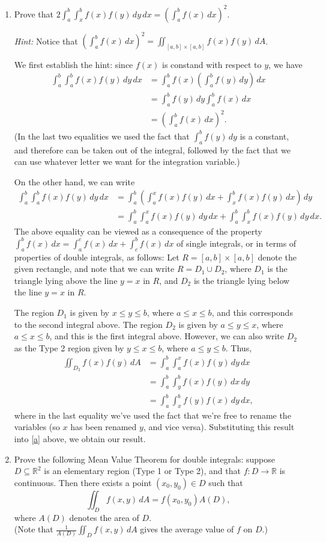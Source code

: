 \documentclass[letterpaper,12pt]{article}
\newcommand{\R}{\mathbb{R}}
\begin{document}
\begin{enumerate}
 \item Prove that $\displaystyle 2\int_a^b\int_x^b f(x)f(y)\,dy\,dx = \left(\int_a^b f(x)\,dx\right)^2$.

{\em Hint:} Notice that $\left(\int_a^b f(x)\,dx\right)^2 = \iint_{[a,b]\times [a,b]}f(x)f(y)\,dA$.

\bigskip

We first establish the hint: since $f(x)$ is constand with respect to $y$, we have
\begin{align*}
 \int_a^b\int_a^b f(x)f(y)\,dy\,dx &= \int_a^b f(x) \left(\int_a^b f(y)\,dy\right)\,dx\\
& = \int_a^b f(y)\,dy \int_a^bf(x)\,dx \\
& = \left(\int_a^b f(x)\,dx\right)^2.
\end{align*}
(In the last two equalities we used the fact that $\int_a^b f(y)\,dy$ is a constant, and therefore can be taken out of the integral, followed by the fact that we can use whatever letter we want for the integration variable.)

On the other hand, we can write
\begin{align}
 \int_a^b\int_a^b f(x)f(y)\,dy\,dx &= \int_a^b \left(\int_a^x f(x)f(y)\,dx +\int_x^b f(x)f(y)\,dx \right)\,dy \nonumber\\
 & = \int_a^b\int_a^x f(x)f(y)\,dy\,dx + \int_a^b\int_x^b f(x)f(y)\,dy\,dx.\label{a}
\end{align}
The above equality can be viewed as a consequence of the property $\int_a^b f(x)\,dx = \int_a^c f(x)\,dx + \int_c^b f(x)\,dx$ of single integrals, or in terms of properties of double integrals, as follows: Let $R=[a,b]\times [a,b]$ denote the given rectangle, and note that we can write $R=D_1\cup D_2$, where $D_1$ is the triangle lying above the line $y=x$ in $R$, and $D_2$ is the triangle lying below the line $y=x$ in $R$.

The region $D_1$ is given by $x\leq y\leq b$, where $a\leq x\leq b$, and this corresponds to the second integral above. The region $D_2$ is given by $a\leq y\leq x$, where $a\leq x\leq b$, and this is the first integral above. However, we can also write $D_2$ as the Type 2 region given by $y\leq x\leq b$, where $a\leq y\leq b$. Thus,
\begin{align*}
 \iint_{D_2}f(x)f(y)\,dA &= \int_a^b\int_a^x f(x)f(y)\,dy\,dx \\
& = \int_a^b\int_y^b f(x)f(y)\,dx\,dy \\
& = \int_a^b\int_x^b f(y)f(x)\,dy\,dx,
\end{align*}
 where in the last equality we've used the fact that we're free to rename the variables (so $x$ has been renamed $y$, and vice versa). Substituting this result into \eqref{a} above, we obtain our result.
\pagebreak
 \item Prove the following Mean Value Theorem for double integrals: suppose $D\subseteq \R^2$ is an elementary region (Type 1 or Type 2), and that $f:D\to \R$ is continuous. Then there exists a point $(x_0,y_0)\in D$ such that 
\[
 \iint_Df(x,y)\,dA = f(x_0,y_0)A(D),
\]
where $A(D)$ denotes the area of $D$. \\
(Note that $\frac{1}{A(D)}\iint_D f(x,y)\,dA$ gives the average value of $f$ on $D$.)


\end{enumerate}
\end{document}
